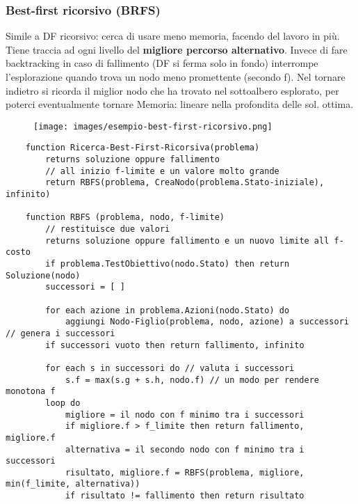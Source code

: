 \subsubsection{Best-first ricorsivo (BRFS)}
Simile a DF ricorsivo: cerca di usare meno memoria, facendo del lavoro in più. Tiene traccia ad ogni livello del \textbf{migliore percorso
alternativo}. Invece di fare backtracking in caso di fallimento (DF si ferma solo in fondo) interrompe l’esplorazione quando
trova un nodo meno promettente (secondo f). Nel tornare indietro si ricorda il miglior nodo che ha
trovato nel sottoalbero esplorato, per poterci eventualmente tornare Memoria: lineare nella profondita delle sol. ottima.
\begin{example}
    \begin{figure}[h!]
        \centering
        \texttt{[image: images/esempio-best-first-ricorsivo.png]}
    \end{figure}
\end{example}
\begin{lstlisting}
    function Ricerca-Best-First-Ricorsiva(problema)
        returns soluzione oppure fallimento
        // all inizio f-limite e un valore molto grande
        return RBFS(problema, CreaNodo(problema.Stato-iniziale), infinito) 

    function RBFS (problema, nodo, f-limite)
        // restituisce due valori
        returns soluzione oppure fallimento e un nuovo limite all f-costo 
        if problema.TestObiettivo(nodo.Stato) then return Soluzione(nodo)
        successori = [ ]

        for each azione in problema.Azioni(nodo.Stato) do
            aggiungi Nodo-Figlio(problema, nodo, azione) a successori // genera i successori
        if successori vuoto then return fallimento, infinito

        for each s in successori do // valuta i successori
            s.f = max(s.g + s.h, nodo.f) // un modo per rendere monotona f
        loop do
            migliore = il nodo con f minimo tra i successori
            if migliore.f > f_limite then return fallimento, migliore.f
            alternativa = il secondo nodo con f minimo tra i successori
            risultato, migliore.f = RBFS(problema, migliore, min(f_limite, alternativa))
            if risultato != fallimento then return risultato
\end{lstlisting}

